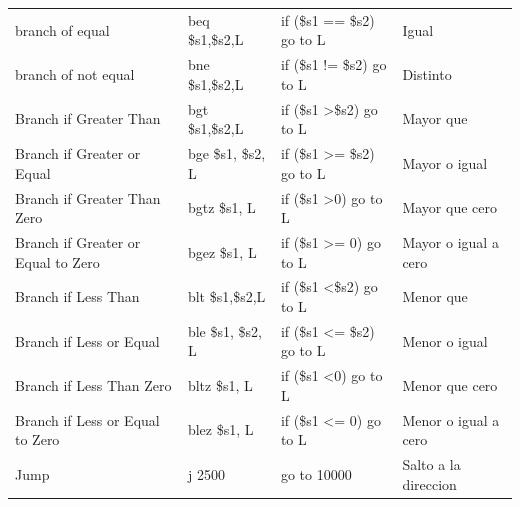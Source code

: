 \documentclass{article}
\begin{document}
\begin{table}[h]
\begin{tabular}{@{}llll@{}}
branch of equal                    & beq \$s1,\$s2,L    & if (\$s1 == \$s2) go to L                 & Igual                                       \\
branch of not equal                & bne \$s1,\$s2,L    & if (\$s1 != \$s2) go to L                 & Distinto                                    \\
Branch if Greater Than             & bgt \$s1,\$s2,L    & if (\$s1 \textgreater \$s2) go to L                  & Mayor que                                   \\
Branch if Greater or Equal         & bge \$s1, \$s2, L  & if (\$s1 \textgreater= \$s2) go to L                 & Mayor o igual                               \\
Branch if Greater Than Zero        & bgtz \$s1, L     & if (\$s1 \textgreater 0) go to L        & Mayor que cero                              \\
Branch if Greater or Equal to Zero & bgez \$s1, L     & if (\$s1 \textgreater{}= 0) go to L     & Mayor o igual a cero                        \\
Branch if Less Than                & blt \$s1,\$s2,L    & if (\$s1 \textless \$s2) go to L                  & Menor que                                   \\
Branch if Less or Equal            & ble \$s1, \$s2, L  & if (\$s1 \textless{}= \$s2) go to L                 & Menor o igual                               \\
Branch if Less Than Zero           & bltz \$s1, L     & if (\$s1 \textless 0) go to L           & Menor que cero                              \\
Branch if Less or Equal to Zero    & blez \$s1, L     & if (\$s1 \textless{}= 0) go to L        & Menor o igual a cero                        \\
Jump                               & j 2500           & go to 10000                             & Salto a la direccion                       
\end{tabular}
\end{table}
\end{document}
